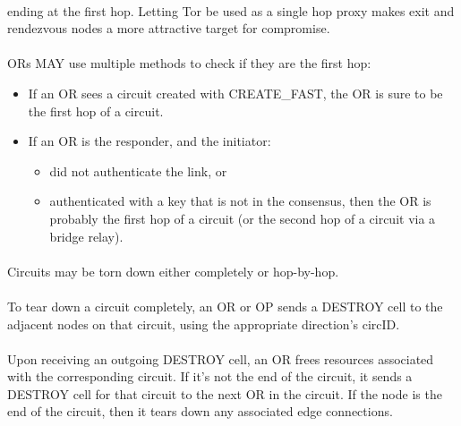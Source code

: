 \paragraph{}
ending at the first hop. Letting Tor be used as a single hop proxy makes
exit and rendezvous nodes a more attractive target for compromise.

\paragraph{}
ORs MAY use multiple methods to check if they are the first hop:

\begin{itemize}
    \item If an OR sees a circuit created with CREATE\_FAST, the OR is sure to be
    the first hop of a circuit.
    \item If an OR is the responder, and the initiator:
    \begin{itemize}
        \item did not authenticate the link, or
        \item authenticated with a key that is not in the consensus,
        then the OR is probably the first hop of a circuit (or the second hop of
        a circuit via a bridge relay).
    \end{itemize}
\end{itemize}

\paragraph{}
Circuits may be torn down either completely or hop-by-hop.

\paragraph{}
To tear down a circuit completely, an OR or OP sends a DESTROY
cell to the adjacent nodes on that circuit, using the appropriate
direction's circID.

\paragraph{}
Upon receiving an outgoing DESTROY cell, an OR frees resources
associated with the corresponding circuit. If it's not the end of
the circuit, it sends a DESTROY cell for that circuit to the next OR
in the circuit. If the node is the end of the circuit, then it tears
down any associated edge connections.

